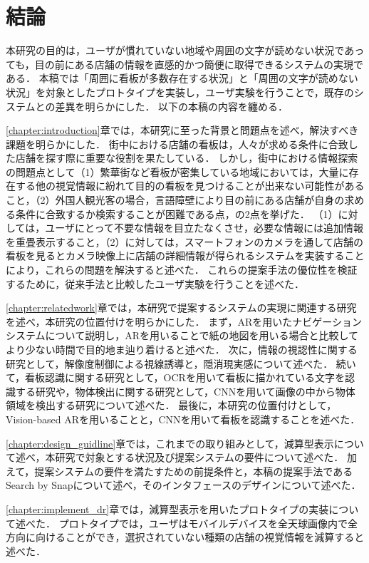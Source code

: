 \chapter{結論}
\label{chapter:conclusion}
  本研究の目的は，ユーザが慣れていない地域や周囲の文字が読めない状況であっても，目の前にある店舗の情報を直感的かつ簡便に取得できるシステムの実現である．
  本稿では「周囲に看板が多数存在する状況」と「周囲の文字が読めない状況」を対象としたプロトタイプを実装し，ユーザ実験を行うことで，既存のシステムとの差異を明らかにした．
  以下の本稿の内容を纏める．

  \ref{chapter:introduction}章では，本研究に至った背景と問題点を述べ，解決すべき課題を明らかにした．
  街中における店舗の看板は，人々が求める条件に合致した店舗を探す際に重要な役割を果たしている．
  しかし，街中における情報探索の問題点として（1）繁華街など看板が密集している地域においては，大量に存在する他の視覚情報に紛れて目的の看板を見つけることが出来ない可能性があること，（2）外国人観光客の場合，言語障壁により目の前にある店舗が自身の求める条件に合致するか検索することが困難である点，の2点を挙げた．
  （1）に対しては，ユーザにとって不要な情報を目立たなくさせ，必要な情報には追加情報を重畳表示すること，（2）に対しては，スマートフォンのカメラを通して店舗の看板を見るとカメラ映像上に店舗の詳細情報が得られるシステムを実装することにより，これらの問題を解決すると述べた．
  これらの提案手法の優位性を検証するために，従来手法と比較したユーザ実験を行うことを述べた．

  \ref{chapter:relatedwork}章では，本研究で提案するシステムの実現に関連する研究を述べ，本研究の位置付けを明らかにした．
  まず，ARを用いたナビゲーションシステムについて説明し，ARを用いることで紙の地図を用いる場合と比較してより少ない時間で目的地ま辿り着けると述べた．
  次に，情報の視認性に関する研究として，解像度制御による視線誘導と，隠消現実感について述べた．
  続いて，看板認識に関する研究として，OCRを用いて看板に描かれている文字を認識する研究や，物体検出に関する研究として，CNNを用いて画像の中から物体領域を検出する研究について述べた．
  最後に，本研究の位置付けとして，Vision-based ARを用いることと，CNNを用いて看板を認識することを述べた．

  \ref{chapter:design_guidline}章では，これまでの取り組みとして，減算型表示について述べ，本研究で対象とする状況及び提案システムの要件について述べた．
  加えて，提案システムの要件を満たすための前提条件と，本稿の提案手法であるSearch by Snapについて述べ，そのインタフェースのデザインについて述べた．

  \ref{chapter:implement_dr}章では，減算型表示を用いたプロトタイプの実装について述べた．
  プロトタイプでは，ユーザはモバイルデバイスを全天球画像内で全方向に向けることができ，選択されていない種類の店舗の視覚情報を減算すると述べた．

